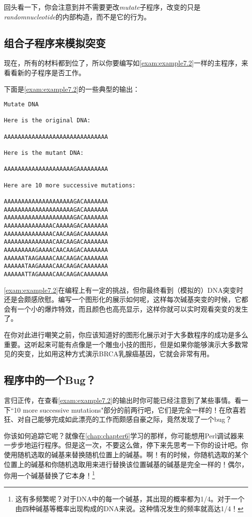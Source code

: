 回头看一下，你会注意到并不需要更改\textit{mutate}子程序，改变的只是\textit{randomnucleotide}的内部构造，而不是它的行为。

\subsection{组合子程序来模拟突变}
现在，所有的材料都到位了，所以你要编写如\autoref{exam:example7.2}一样的主程序，来看看新的子程序是否工作。



下面是\autoref{exam:example7.2}的一些典型的输出：

\begin{lstlisting}
Mutate DNA

Here is the original DNA:

AAAAAAAAAAAAAAAAAAAAAAAAAAAAAA

Here is the mutant DNA:

AAAAAAAAAAAAAAAAAAAAGAAAAAAAAA

Here are 10 more successive mutations:

AAAAAAAAAAAAAAAAAAAAGACAAAAAAA
AAAAAAAAAAAAAAAAAAAAGACAAAAAAA
AAAAAAAAAAAAAAAAAAAAGACAAAAAAA
AAAAAAAAAAAAAACAAAAAGACAAAAAAA
AAAAAAAAAAAAAACAACAAGACAAAAAAA
AAAAAAAAAAAAAACAACAAGACAAAAAAA
AAAAAAAAAGAAAACAACAAGACAAAAAAA
AAAAAATAAGAAAACAACAAGACAAAAAAA
AAAAAATAAGAAAACAACAAGACAAAAAAA
AAAAAATTAGAAAACAACAAGACAAAAAAA
\end{lstlisting}

\autoref{exam:example7.2}在编程上有一定的挑战，但你最终看到（模拟的）DNA突变时还是会颇感欣慰。编写一个图形化的展示如何呢，这样每次碱基突变的时候，它都会有一个小的爆炸特效，而且颜色也高亮显示，这样你就可以实时观看突变的发生了。

在你对此进行嘲笑之前，你应该知道好的图形化展示对于大多数程序的成功是多么重要。这听起来可能有点像是一个雕虫小技的图形，但是如果你能够演示大多数常见的突变，比如用这种方式演示BRCA乳腺癌基因，它就会非常有用。

\subsection{程序中的一个Bug？}
言归正传，在查看\autoref{exam:example7.2}的输出时你可能已经注意到了某些事情。看一下``10 more successive mutations"部分的前两行吧，它们是完全一样的！在欣喜若狂、对自己能够完成如此漂亮的工作而颇感自豪之际，竟然发现了一个bug？

你该如何追踪它呢？就像在\autoref{chap:chapter6}学习的那样，你可能想用Perl调试器来一步步地运行程序。但是这一次，不要这么做，停下来先思考一下你的设计吧。你使用随机选取的碱基来替换随机位置上的碱基。啊！有的时候，你随机选取的某个位置上的碱基和你随机选取用来进行替换该位置碱基的碱基是完全一样的！偶尔，你用一个碱基替换了它本身！\footnote{这有多频繁呢？对于DNA中的每一个碱基，其出现的概率都为1/4。对于一个由四种碱基等概率出现构成的DNA来说。这种情况发生的频率就高达1/4！} 

